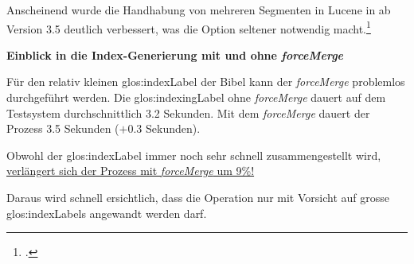 Anscheinend wurde die Handhabung von mehreren Segmenten in Lucene in ab Version 3.5 deutlich verbessert, was die Option seltener notwendig macht.\footcite{LUCENE-rename_optimize_to_a_less_cool-sounding_name_ASF_JIRA_2016-05-08}

\begin{framed}
	\textbf{Einblick in die Index-Generierung mit und ohne \textit{forceMerge}}
	
	Für den relativ kleinen \gls{glos:indexLabel} der Bibel kann der \textit{forceMerge} problemlos durchgeführt werden.
	Die \gls{glos:indexingLabel} ohne \textit{forceMerge} dauert auf dem Testsystem durchschnittlich 3.2 Sekunden. Mit dem \textit{forceMerge} dauert der Prozess 3.5 Sekunden ($+0.3$ Sekunden).
	
	Obwohl  der \gls{glos:indexLabel} immer noch sehr schnell zusammengestellt wird, \ul{verlängert sich der Prozess mit \textit{forceMerge} um 9\%!}
	
	Daraus wird schnell ersichtlich, dass die Operation nur mit Vorsicht auf grosse \glspl{glos:indexLabel} angewandt werden darf.
\end{framed}


